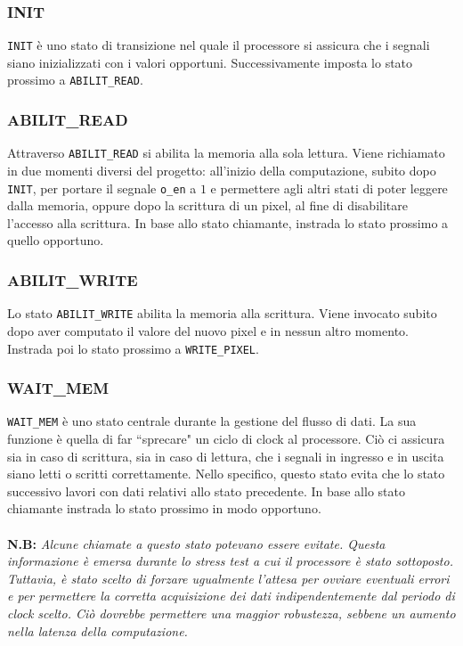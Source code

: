 \documentclass[11pt, a4paper]{article}
\begin{document}
\subsubsection{INIT}
\texttt{INIT} è uno stato di transizione nel quale il processore si assicura che i segnali siano inizializzati con i valori opportuni. Successivamente imposta lo stato prossimo a \texttt{ABILIT\_READ}.

\subsubsection{ABILIT\_READ}
Attraverso \texttt{ABILIT\_READ} si abilita la memoria alla sola lettura. Viene richiamato in due momenti diversi del progetto: all'inizio della computazione, subito dopo \texttt{INIT}, per portare il segnale \texttt{o\_en} a $1$ e permettere agli altri stati di poter leggere dalla memoria, oppure dopo la scrittura di un pixel, al fine di disabilitare l'accesso alla scrittura. In base allo stato chiamante, instrada lo stato prossimo a quello opportuno.

\subsubsection{ABILIT\_WRITE}
Lo stato \texttt{ABILIT\_WRITE} abilita la memoria alla scrittura. Viene invocato subito dopo aver computato il valore del nuovo pixel e in nessun altro momento. Instrada poi lo stato prossimo a \texttt{WRITE\_PIXEL}.

\pagebreak
\subsubsection{WAIT\_MEM}
\texttt{WAIT\_MEM} è uno stato centrale durante la gestione del flusso di dati. La sua funzione è quella di far ``sprecare" un ciclo di clock al processore. Ciò ci assicura sia in caso di scrittura, sia in caso di lettura, che i segnali in ingresso e in uscita siano letti o scritti correttamente. Nello specifico, questo stato evita che lo stato successivo lavori con dati relativi allo stato precedente. In base allo stato chiamante instrada lo stato prossimo in modo opportuno.\\ \\
\textbf{N.B:} \textit{Alcune chiamate a questo stato potevano essere evitate. Questa informazione è emersa durante lo stress test a cui il processore è stato sottoposto. Tuttavia, è stato scelto di forzare ugualmente l’attesa per ovviare eventuali errori e per permettere la corretta acquisizione dei dati indipendentemente dal periodo di clock scelto. Ciò dovrebbe permettere una maggior robustezza, sebbene un aumento nella latenza della computazione.}
\end{document}
